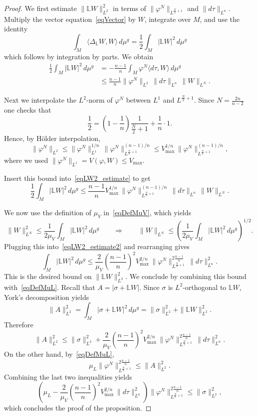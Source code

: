 \documentclass[a4paper, 10pt, reqno]{amsart}
\theoremstyle{plain}
\theoremstyle{remark}
\theoremstyle{definition}
\renewcommand{\phi}{\varphi}
\newcommand{\bL}{\mathbb{L}}
\begin{document}
\begin{proof}
	We first estimate $\|\bL W\|_{L^2}^2$ in terms of $\|\phi^N\|_{L^{\frac N2+1}}$
	and $\|d\tau\|_{L^n}$. Multiply the vector equation~\eqref{eqVector} by $W$,
	integrate over $M$, and use the identity
	\[
		\int_M \langle \Delta_{\bL}W, W\rangle\,d\mu^g
		= \frac{1}{2} \int_M |\bL W|^2\,d\mu^g
	\]
	which follows by integration by parts. We obtain
	\begin{align}
		\frac{1}{2} \int_M |\bL W|^2\,d\mu^g
		 & = -\frac{n-1}{n}\int_M \phi^N \langle d\tau, W\rangle\,d\mu^g \nonumber \\
		 & \leq\frac{n-1}{n}\|\phi^N\|_{L^2}\,\|d\tau\|_{L^n}\,\|W\|_{L^N}.
		\label{eqLW2_estimate}
	\end{align}

	Next we interpolate the $L^2$-norm of $\phi^N$ between $L^1$ and $L^{\frac
				{N}{2}+1}$. Since $N=\frac{2n}{n-2}$ one checks that
	\[
		\frac{1}{2} = \left(1-\frac{1}{n}\right)\frac{1}{\frac{N}{2}+1} + \frac{1}{n}\cdot 1.
	\]
	Hence, by H\"older interpolation,
	\[
		\|\phi^N\|_{L^2}
		\le
		\|\phi^N\|_{L^1}^{1/n}\,
		\|\phi^N\|_{L^{\frac N2+1}}^{(n-1)/n}
		\le
		V_{\max}^{1/n}\,
		\|\phi^N\|_{L^{\frac N2+1}}^{(n-1)/n},
	\]
	where we used $\|\phi^N\|_{L^1} = V(\phi,W) \leq V_{\max}$.

	Insert this bound into~\eqref{eqLW2_estimate} to get
	\begin{equation}\label{eqLW2_estimate2}
		\frac12\int_M |\bL W|^2\,d\mu^g
		\le
		\frac{n-1}{n}V_{\max}^{1/n}\,
		\|\phi^N\|_{L^{\frac N2+1}}^{(n-1)/n}\,
		\|d\tau\|_{L^n}\,
		\|W\|_{L^N}.
	\end{equation}

	We now use the definition of $\mu_V$ in~\eqref{eqDefMuV}, which yields
	\[
		\|W\|_{L^N}^2
		\leq\frac{1}{2\mu_V}\int_M |\bL W|^2\,d\mu^g
		\qquad\Longrightarrow\qquad
		\|W\|_{L^N}
		\leq\left(\frac{1}{2\mu_V}\int_M |\bL W|^2\,d\mu^g\right)^{1/2}.
	\]
	Plugging this into~\eqref{eqLW2_estimate2} and rearranging gives
	\[
		\int_M |\bL W|^2\,d\mu^g
		\le
		\frac{2}{\mu_V}\left(\frac{n-1}{n}\right)^2
		V_{\max}^{2/n}\,
		\|\phi^N\|_{L^{\frac N2+1}}^{2\frac{n-1}{n}}\,
		\|d\tau\|_{L^n}^2.
	\]
	This is the desired bound on $\|\bL W\|_{L^2}^2$. We conclude by combining this
	bound with~\eqref{eqDefMuL}. Recall that $A=|\sigma+\bL W|$. Since $\sigma$ is
	$L^2$-orthogonal to $\bL W$, York's decomposition yields
	\[
		\|A\|_{L^2}^2
		=\int_M |\sigma+\bL W|^2\,d\mu^g
		=\|\sigma\|_{L^2}^2 + \|\bL W\|_{L^2}^2.
	\]
	Therefore
	\[
		\|A\|_{L^2}^2
		\le
		\|\sigma\|_{L^2}^2
		+
		\frac{2}{\mu_V}\left(\frac{n-1}{n}\right)^2
		V_{\max}^{2/n}\,
		\|\phi^N\|_{L^{\frac N2+1}}^{2\frac{n-1}{n}}\,
		\|d\tau\|_{L^n}^2.
	\]
	On the other hand, by~\eqref{eqDefMuL},
	\[
		\mu_L\|\phi^N\|_{L^{\frac N2+1}}^{2\frac{n-1}{n}}
		\leq\|A\|_{L^2}^2.
	\]
	Combining the last two inequalities yields
	\[
		\left(
		\mu_L
		-\frac{2}{\mu_V}\left(\frac{n-1}{n}\right)^2
		V_{\max}^{2/n}\,
		\|d\tau\|_{L^n}^2
		\right)
		\|\phi^N\|_{L^{\frac N2+1}}^{2\frac{n-1}{n}}
		\leq\|\sigma\|_{L^2}^2,
	\]
	which concludes the proof of the proposition.
\end{proof}
\end{document}
